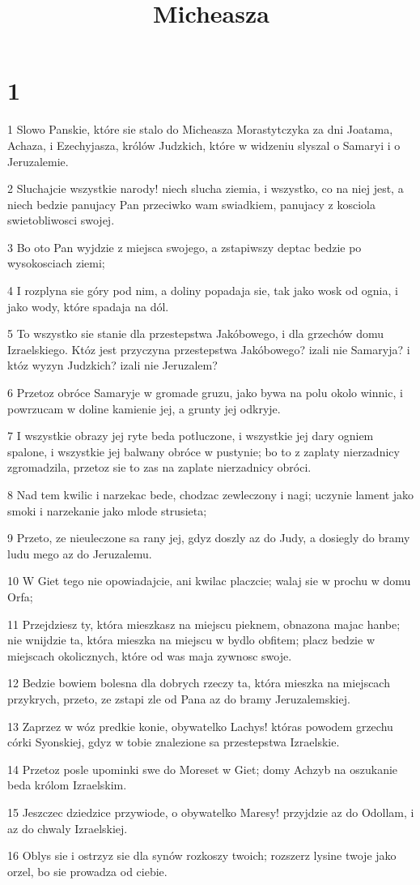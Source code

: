 

\title{Micheasza}


\chapter{1}

\par 1 Slowo Panskie, które sie stalo do Micheasza Morastytczyka za dni Joatama, Achaza, i Ezechyjasza, królów Judzkich, które w widzeniu slyszal o Samaryi i o Jeruzalemie.
\par 2 Sluchajcie wszystkie narody! niech slucha ziemia, i wszystko, co na niej jest, a niech bedzie panujacy Pan przeciwko wam swiadkiem, panujacy z kosciola swietobliwosci swojej.
\par 3 Bo oto Pan wyjdzie z miejsca swojego, a zstapiwszy deptac bedzie po wysokosciach ziemi;
\par 4 I rozplyna sie góry pod nim, a doliny popadaja sie, tak jako wosk od ognia, i jako wody, które spadaja na dól.
\par 5 To wszystko sie stanie dla przestepstwa Jakóbowego, i dla grzechów domu Izraelskiego. Któz jest przyczyna przestepstwa Jakóbowego? izali nie Samaryja? i któz wyzyn Judzkich? izali nie Jeruzalem?
\par 6 Przetoz obróce Samaryje w gromade gruzu, jako bywa na polu okolo winnic, i powrzucam w doline kamienie jej, a grunty jej odkryje.
\par 7 I wszystkie obrazy jej ryte beda potluczone, i wszystkie jej dary ogniem spalone, i wszystkie jej balwany obróce w pustynie; bo to z zaplaty nierzadnicy zgromadzila, przetoz sie to zas na zaplate nierzadnicy obróci.
\par 8 Nad tem kwilic i narzekac bede, chodzac zewleczony i nagi; uczynie lament jako smoki i narzekanie jako mlode strusieta;
\par 9 Przeto, ze nieuleczone sa rany jej, gdyz doszly az do Judy, a dosiegly do bramy ludu mego az do Jeruzalemu.
\par 10 W Giet tego nie opowiadajcie, ani kwilac placzcie; walaj sie w prochu w domu Orfa;
\par 11 Przejdziesz ty, która mieszkasz na miejscu pieknem, obnazona majac hanbe; nie wnijdzie ta, która mieszka na miejscu w bydlo obfitem; placz bedzie w miejscach okolicznych, które od was maja zywnosc swoje.
\par 12 Bedzie bowiem bolesna dla dobrych rzeczy ta, która mieszka na miejscach przykrych, przeto, ze zstapi zle od Pana az do bramy Jeruzalemskiej.
\par 13 Zaprzez w wóz predkie konie, obywatelko Lachys! któras powodem grzechu córki Syonskiej, gdyz w tobie znalezione sa przestepstwa Izraelskie.
\par 14 Przetoz posle upominki swe do Moreset w Giet; domy Achzyb na oszukanie beda królom Izraelskim.
\par 15 Jeszczec dziedzice przywiode, o obywatelko Maresy! przyjdzie az do Odollam, i az do chwaly Izraelskiej.
\par 16 Oblys sie i ostrzyz sie dla synów rozkoszy twoich; rozszerz lysine twoje jako orzel, bo sie prowadza od ciebie.

